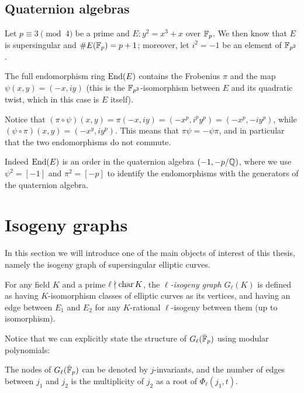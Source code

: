 \subsection{Quaternion algebras}

\cite{QuatAlg}

\begin{example}
    Let $p\equiv3\pmod4$ be a prime and $E:y^2=x^3+x$ over $\mathbb{F}_p$. We then know that $E$ is supersingular and $\# E(\mathbb{F}_p)=p+1$; moreover, let $i^2=-1$ be an element of $\mathbb{F}_{p^2}$.
    
    The full endomorphism ring $\operatorname{End}(E)$ contains the Frobenius $\pi$ and the map $\psi(x,y)=(-x,iy)$ (this is the $\mathbb{F}_{p^2}$-isomorphism between $E$ and its quadratic twist, which in this case is $E$ itself).
    
    Notice that $(\pi\circ\psi)(x,y)=\pi(-x,iy)=(-x^p,i^py^p)=(-x^p,-iy^p)$, while $(\psi\circ\pi)(x,y)=(-x^y,iy^p)$. This means that $\pi\psi=-\psi\pi$, and in particular that the two endomorphisms do not commute.
    
    Indeed $\operatorname{End}(E)$ is an order in the quaternion algebra $(-1,-p/\mathbb{Q})$, where we use $\psi^2=[-1]$ and $\pi^2=[-p]$ to identify the endomorphisms with the generators of the quaternion algebra.
\end{example}

\section{Isogeny graphs}
In this section we will introduce one of the main objects of interest of this thesis, namely the isogeny graph of supersingular elliptic curves.

\begin{definition}
    For any field $K$ and a prime $\ell\nmid\operatorname{char} K$, the \emph{$\ell$-isogeny graph} $G_\ell(K)$ is defined as having $K$-isomorphism classes of elliptic curves as its vertices, and having an edge between $E_1$ and $E_2$ for any $K$-rational $\ell$-isogeny between them (up to isomorphism).
\end{definition}

Notice that we can explicitly state the structure of $G_\ell(\bar{\mathbb{F}}_p)$ using modular polynomials:
\begin{proposition}
    The nodes of $G_\ell(\bar {\mathbb{F}}_p)$ can be denoted by $j$-invariants, and the number of edges between $j_1$ and $j_2$ is the multiplicity of $j_2$ as a root of $\Phi_\ell(j_1,t)$.
\end{proposition}

